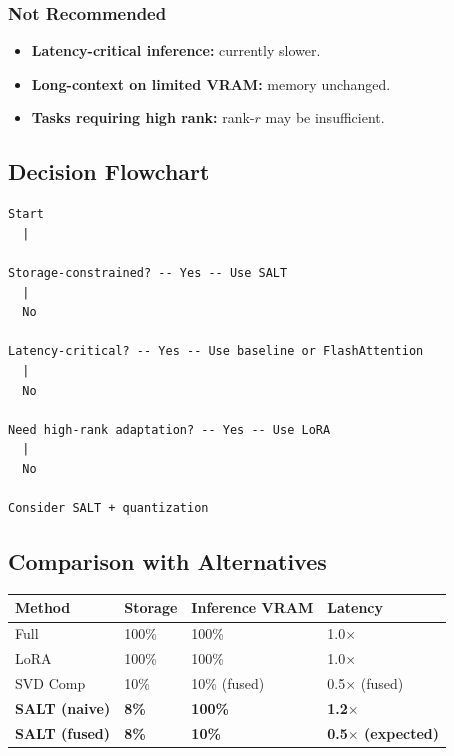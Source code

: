 \subsubsection{Not Recommended}

\begin{itemize}
\item \textbf{Latency-critical inference:} currently slower.
\item \textbf{Long-context on limited VRAM:} memory unchanged.
\item \textbf{Tasks requiring high rank:} rank-$r$ may be insufficient.

\end{itemize}
\subsection{Decision Flowchart}

\begin{lstlisting}
Start
  |
   
Storage-constrained? -- Yes -- Use SALT
  |
  No
   
Latency-critical? -- Yes -- Use baseline or FlashAttention
  |
  No
   
Need high-rank adaptation? -- Yes -- Use LoRA
  |
  No
   
Consider SALT + quantization
\end{lstlisting}

\subsection{Comparison with Alternatives}

\begin{table}[H]
\centering
\small
\begin{tabular}{llll}
\toprule
\textbf{Method} & \textbf{Storage} & \textbf{Inference VRAM} & \textbf{Latency} \\
\midrule
Full & 100\% & 100\% & 1.0$\times$ \\
LoRA & 100\% & 100\% & 1.0$\times$ \\
SVD Comp & 10\% & 10\% (fused) & 0.5$\times$ (fused) \\
\textbf{SALT (naive)} & \textbf{8\%} & \textbf{100\%} & \textbf{1.2$\times$} \\
\textbf{SALT (fused)} & \textbf{8\%} & \textbf{10\%} & \textbf{0.5$\times$ (expected)} \\
\bottomrule
\end{tabular}
\end{table}

